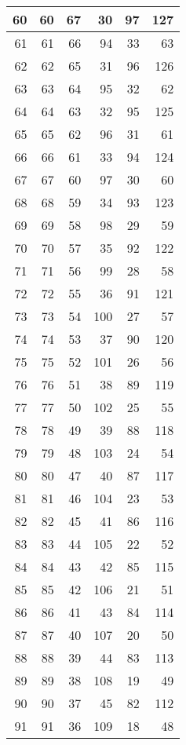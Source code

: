 \begin{longtable}{|r|r|r|r|r|r|}
      \hline 
      60&60&67&30&97&127\\
      \hline 
      61&61&66&94&33&63\\
      \hline 
      62&62&65&31&96&126\\
      \hline 
      63&63&64&95&32&62\\
      \hline 
      64&64&63&32&95&125\\
      \hline 
      65&65&62&96&31&61\\
      \hline 
      66&66&61&33&94&124\\
      \hline 
      67&67&60&97&30&60\\
      \hline 
      68&68&59&34&93&123\\
      \hline 
      69&69&58&98&29&59\\
      \hline 
      70&70&57&35&92&122\\
      \hline 
      71&71&56&99&28&58\\
      \hline 
      72&72&55&36&91&121\\
      \hline 
      73&73&54&100&27&57\\
      \hline 
      74&74&53&37&90&120\\
      \hline 
      75&75&52&101&26&56\\
      \hline 
      76&76&51&38&89&119\\
      \hline 
      77&77&50&102&25&55\\
      \hline 
      78&78&49&39&88&118\\
      \hline 
      79&79&48&103&24&54\\
      \hline 
      80&80&47&40&87&117\\
      \hline 
      81&81&46&104&23&53\\
      \hline 
      82&82&45&41&86&116\\
      \hline 
      83&83&44&105&22&52\\
      \hline 
      84&84&43&42&85&115\\
      \hline 
      85&85&42&106&21&51\\
      \hline 
      86&86&41&43&84&114\\
      \hline 
      87&87&40&107&20&50\\
      \hline 
      88&88&39&44&83&113\\
      \hline 
      89&89&38&108&19&49\\
      \hline 
      90&90&37&45&82&112\\
      \hline 
      91&91&36&109&18&48\\
      \hline 

\end{longtable}
